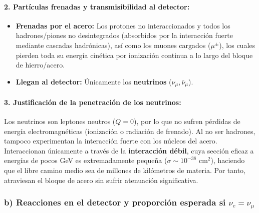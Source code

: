 \begin{problema}
\paragraph{2. Partículas frenadas y transmisibilidad al detector:}
\begin{itemize}
    \item \textbf{Frenadas por el acero:} Los protones no interaccionados y todos los hadrones/piones no desintegrados (absorbidos por la interacción fuerte mediante cascadas hadrónicas), así como los muones cargados ($\mu^\pm$), los cuales pierden toda su energía cinética por ionización continua a lo largo del bloque de hierro/acero.
    \item \textbf{Llegan al detector:} Únicamente los \textbf{neutrinos} ($\nu_\mu, \bar{\nu}_\mu$).
\end{itemize}

\paragraph{3. Justificación de la penetración de los neutrinos:}
Los neutrinos son leptones neutros ($Q = 0$), por lo que no sufren pérdidas de energía electromagnéticas (ionización o radiación de frenado). Al no ser hadrones, tampoco experimentan la interacción fuerte con los núcleos del acero. Interaccionan únicamente a través de la \textbf{interacción débil}, cuya sección eficaz a energías de pocos GeV es extremadamente pequeña ($\sigma \sim 10^{-38}\text{ cm}^2$), haciendo que el libre camino medio sea de millones de kilómetros de materia. Por tanto, atraviesan el bloque de acero sin sufrir atenuación significativa.

\subsubsection*{b) Reacciones en el detector y proporción esperada si $\nu_e = \nu_\mu$}


\end{problema}
